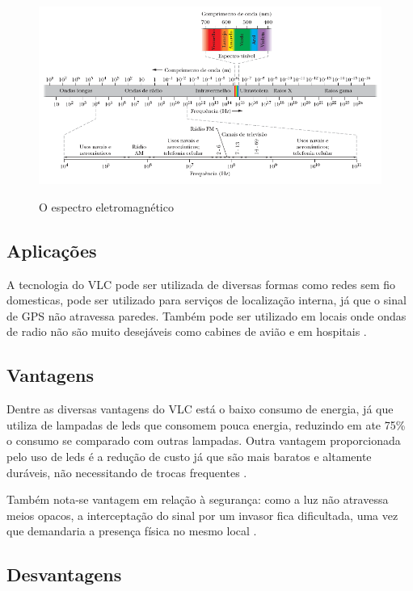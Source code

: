 \begin{figure}[!htbp]
  \caption{O espectro eletromagnético}
  \includegraphics[scale=0.65]{images/espectro_eletromagnetico.png}
  \label{fig:espectro_eletromagnetico}
\end{figure}

\subsection{Aplicações}

A tecnologia do VLC pode ser utilizada de diversas formas como redes sem fio domesticas, pode ser utilizado para serviços de localização interna, já que o sinal de GPS não atravessa paredes. Também pode ser utilizado em locais onde ondas de radio não são muito desejáveis como cabines de avião e em hospitais \cite{matheus2017comunicaccao}. 

\subsection{Vantagens}

Dentre as diversas vantagens do VLC está o baixo consumo de energia, já que utiliza de lampadas de leds que consomem pouca energia, reduzindo em ate 75\% o consumo se comparado com outras lampadas. Outra vantagem proporcionada pelo uso de leds é a redução de custo já que são mais baratos e altamente duráveis, não necessitando de trocas frequentes \cite{matheus2017comunicaccao}.

Também nota-se vantagem em relação à segurança: como a luz não atravessa meios opacos, a interceptação do sinal por um invasor fica dificultada, uma vez que demandaria a presença física no mesmo local \cite{conceiccao2015comunicaccao}.

\subsection{Desvantagens}

